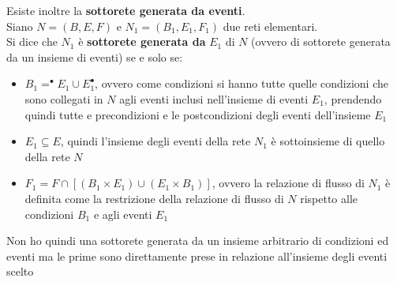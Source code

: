 Esiste inoltre la \textbf{sottorete generata da eventi}.\\
Siano $N=(B,E,F)$ e $N_1=(B_1,E_1,F_1)$ due reti elementari.\\ 
Si dice che $N_1$ è \textbf{sottorete generata da} $E_1$ di $N$ (ovvero di sottorete generata da un insieme di eventi)  se e solo se: 
\begin{itemize} 
    \item $B_1= ^\bullet E_1\cup E_1^\bullet$, ovvero come condizioni si hanno tutte quelle condizioni che sono collegati in $N$ agli eventi inclusi nell'insieme di eventi $E_1$, prendendo quindi tutte e precondizioni e le postcondizioni degli eventi dell'insieme $E_1$ 
    \item $E_1\subseteq E$, quindi l'insieme degli eventi della rete $N_1$ è sottoinsieme di quello della rete $N$ 
    \item $F_1=F\cap[(B_1\times E_1)\cup (E_1\times B_1)]$, ovvero la relazione di flusso di $N_1$ è definita come la restrizione della relazione di flusso di $N$ rispetto alle condizioni $B_1$ e agli eventi $E_1$ 
\end{itemize} 
Non ho quindi una sottorete generata da un insieme arbitrario di condizioni ed eventi ma le prime sono direttamente prese in relazione all'insieme degli eventi scelto

